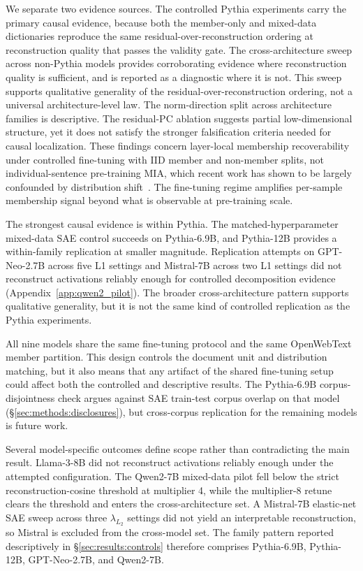 We separate two evidence sources. The controlled Pythia experiments carry the primary causal evidence, because both the member-only and mixed-data dictionaries reproduce the same residual-over-reconstruction ordering at reconstruction quality that passes the validity gate. The cross-architecture sweep across non-Pythia models provides corroborating evidence where reconstruction quality is sufficient, and is reported as a diagnostic where it is not. This sweep supports qualitative generality of the residual-over-reconstruction ordering, not a universal architecture-level law. The norm-direction split across architecture families is descriptive. The residual-PC ablation suggests partial low-dimensional structure, yet it does not satisfy the stronger falsification criteria needed for causal localization. These findings concern layer-local membership recoverability under controlled fine-tuning with IID member and non-member splits, not individual-sentence pre-training MIA, which recent work has shown to be largely confounded by distribution shift~\citep{maini2024dataset, duan2024membership}. The fine-tuning regime amplifies per-sample membership signal beyond what is observable at pre-training scale.

The strongest causal evidence is within Pythia. The matched-hyperparameter mixed-data SAE control succeeds on Pythia-6.9B, and Pythia-12B provides a within-family replication at smaller magnitude. Replication attempts on GPT-Neo-2.7B across five L1 settings and Mistral-7B across two L1 settings did not reconstruct activations reliably enough for controlled decomposition evidence (Appendix~\ref{app:qwen2_pilot}). The broader cross-architecture pattern supports qualitative generality, but it is not the same kind of controlled replication as the Pythia experiments.

All nine models share the same fine-tuning protocol and the same OpenWebText member partition. This design controls the document unit and distribution matching, but it also means that any artifact of the shared fine-tuning setup could affect both the controlled and descriptive results. The Pythia-6.9B corpus-disjointness check argues against SAE train-test corpus overlap on that model (\S\ref{sec:methods:disclosures}), but cross-corpus replication for the remaining models is future work.

Several model-specific outcomes define scope rather than contradicting the main result. Llama-3-8B did not reconstruct activations reliably enough under the attempted configuration. The Qwen2-7B mixed-data pilot fell below the strict reconstruction-cosine threshold at multiplier 4, while the multiplier-8 retune clears the threshold and enters the cross-architecture set. A Mistral-7B elastic-net SAE sweep across three $\lambda_{L_2}$ settings did not yield an interpretable reconstruction, so Mistral is excluded from the cross-model set. The family pattern reported descriptively in \S\ref{sec:results:controls} therefore comprises Pythia-6.9B, Pythia-12B, GPT-Neo-2.7B, and Qwen2-7B.

